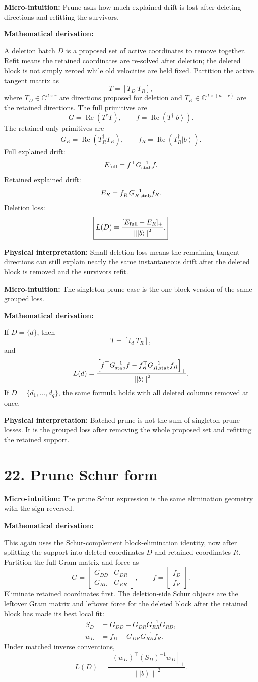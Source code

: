 \documentclass[10pt,twocolumn]{article}
\newcommand{\ket}[1]{\left|#1\right\rangle}
\newcommand{\norm}[1]{\left\lVert #1\right\rVert}
\newcommand{\C}{\mathbb C}
\newcommand{\Real}{\operatorname{Re}}
\newcommand{\micro}[1]{%
  \par\smallskip
  \noindent\textcolor{deepblue}{\textbf{Micro-intuition:}} #1
  \par\smallskip}
\newcommand{\deriv}{%
  \par\noindent\textcolor{deepviolet}{\textbf{Mathematical derivation:}}\par\vspace{-1mm}}
\newcommand{\phys}[1]{%
  \par\smallskip
  \noindent\textcolor{deepgreen}{\textbf{Physical interpretation:}} #1
  \par\smallskip}
\begin{document}
\micro{Prune asks how much explained drift is lost after deleting directions
and refitting the survivors.}

\deriv
A deletion batch \(D\) is a proposed set of active coordinates to remove
together. Refit means the retained coordinates are re-solved after deletion;
the deleted block is not simply zeroed while old velocities are held fixed.
Partition the active tangent matrix as
\[
T=[T_D~T_R],
\]
where \(T_D\in\C^{d\times r}\) are directions proposed for deletion and
\(T_R\in\C^{d\times(n-r)}\) are the retained directions. The full primitives
are
\[
G=\Real(T^\dagger T),
\qquad
f=\Real(T^\dagger\ket b).
\]
The retained-only primitives are
\[
G_R=\Real(T_R^\dagger T_R),
\qquad
f_R=\Real(T_R^\dagger\ket b).
\]
Full explained drift:
\[
E_{\rm full}=f^\top G_{\rm stab}^{-1}f.
\]
Retained explained drift:
\[
E_R=f_R^\top G_{R,{\rm stab}}^{-1}f_R.
\]
Deletion loss:
\[
\boxed{
L(D)
=
\frac{[E_{\rm full}-E_R]_+}{\norm{\ket b}^2}.
}
\]

\phys{Small deletion loss means the remaining tangent directions can still
explain nearly the same instantaneous drift after the deleted block is removed
and the survivors refit.}

\micro{The singleton prune case is the one-block version of the same grouped
loss.}

\deriv
If \(D=\{d\}\), then
\[
T=[t_d~T_R],
\]
and
\[
L(d)
=
\frac{
\left[
f^\top G_{\rm stab}^{-1}f
-f_R^\top G_{R,{\rm stab}}^{-1}f_R
\right]_+
}{\norm{\ket b}^2}.
\]
If \(D=\{d_1,\ldots,d_q\}\), the same formula holds with all deleted columns
removed at once.

\phys{Batched prune is not the sum of singleton prune losses. It is the grouped
loss after removing the whole proposed set and refitting the retained support.}

\section*{22. Prune Schur form}

\micro{The prune Schur expression is the same elimination geometry with the sign
reversed.}

\deriv
This again uses the Schur-complement block-elimination identity, now after
splitting the support into deleted coordinates \(D\) and retained coordinates
\(R\).
Partition the full Gram matrix and force as
\[
G=
\begin{bmatrix}
G_{DD}&G_{DR}\\
G_{RD}&G_{RR}
\end{bmatrix},
\qquad
f=
\begin{bmatrix}
f_D\\
f_R
\end{bmatrix}.
\]
Eliminate retained coordinates first. The deletion-side Schur objects are the
leftover Gram matrix and leftover force for the deleted block after the retained
block has made its best local fit:
\[
\begin{aligned}
S_D^-&=G_{DD}-G_{DR}G_{RR}^{-1}G_{RD},\\
w_D^-&=f_D-G_{DR}G_{RR}^{-1}f_R.
\end{aligned}
\]
Under matched inverse conventions,
\[
L(D)
=
\frac{[(w_D^-)^\top(S_D^-)^{-1}w_D^-]_+}{\norm{\ket b}^2}.
\]
\end{document}
